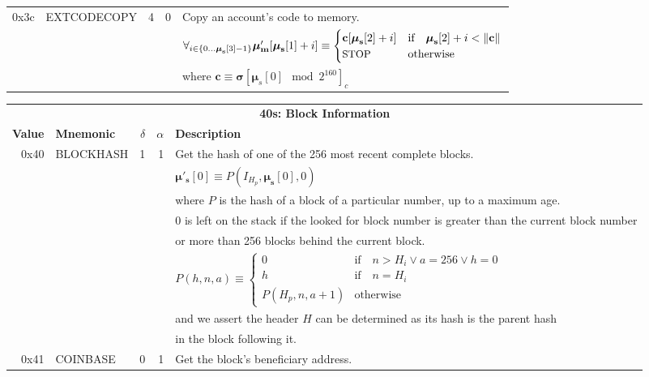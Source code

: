 \documentclass[9pt,oneside]{amsart}
\begin{document}
\begin{tabular*}{\columnwidth}[h]{rlrrl}
\midrule
0x3c & {\small EXTCODECOPY} & 4 & 0 & Copy an account's code to memory. \\
&&&& $\forall_{i \in \{ 0 \dots \boldsymbol{\mu}_\mathbf{s}[3] - 1\} } \boldsymbol{\mu}'_\mathbf{m}[\boldsymbol{\mu}_\mathbf{s}[1] + i ] \equiv
\begin{cases} \mathbf{c}[\boldsymbol{\mu}_\mathbf{s}[2] + i] & \text{if} \quad \boldsymbol{\mu}_\mathbf{s}[2] + i < \lVert \mathbf{c} \rVert \\ \text{\small STOP} & \text{otherwise} \end{cases}$\\
&&&& where $\mathbf{c} \equiv \boldsymbol{\sigma}[\boldsymbol{\mu}_s[0] \mod 2^{160}]_c$ \\
\bottomrule
\end{tabular*}

\begin{tabular*}{\columnwidth}[h]{rlrrl}
\toprule
\multicolumn{5}{c}{\textbf{40s: Block Information}} \vspace{5pt} \\
\textbf{Value} & \textbf{Mnemonic} & $\delta$ & $\alpha$ & \textbf{Description} \vspace{5pt} \\
0x40 & {\small BLOCKHASH} & 1 & 1 & Get the hash of one of the 256 most recent complete blocks. \\
&&&& $\boldsymbol{\mu}'_\mathbf{s}[0] \equiv P(I_{H_p}, \boldsymbol{\mu}_\mathbf{s}[0], 0)$ \\
&&&& where $P$ is the hash of a block of a particular number, up to a maximum age.\\
&&&& 0 is left on the stack if the looked for block number is greater than the current block number \\
&&&& or more than 256 blocks behind the current block. \\
&&&& $P(h, n, a) \equiv \begin{cases} 0 & \text{if} \quad n > H_i \vee a = 256 \vee h = 0 \\ h & \text{if} \quad n = H_i \\ P(H_p, n, a + 1) & \text{otherwise} \end{cases}$ \\
&&&& and we assert the header $H$ can be determined as its hash is the parent hash \\
&&&& in the block following it. \\
\midrule
0x41 & {\small COINBASE} & 0 & 1 & Get the block's beneficiary address. \\

\end{tabular*}
\end{document}
